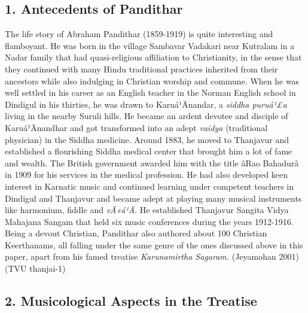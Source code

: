 \subsection*{1. Antecedents of Pandithar}

The life story of Abraham Pandithar (1859-1919) is quite interesting and flamboyant. He was born in the village Sambavar Vadakari near Kutralam in a Nadar family that had quasi-religious affiliation to Christianity, in the sense that they continued with many Hindu traditional practices inherited from their ancestors while also indulging in Christian worship and commune. When he was well settled in his career as an English teacher in the Norman English school in Dindigul in his thirties, he was drawn to Karuá¹Änandar, a \textit{siddha puruá¹£a} living in the nearby Suruli hills. He became an ardent devotee and disciple of Karuá¹Änandhar and got transformed into an adept \textit{vaidya} (traditional physician) in the Siddha medicine. Around 1883, he moved to Thanjavur and established a flourishing Siddha medical center that brought him a lot of fame and wealth. The British government awarded him with the title âRao Bahadurâ in 1909 for his services in the medical profession. He had also developed keen interest in Karnatic music and continued learning under competent teachers in Dindigul and Thanjavur and became adept at playing many musical instruments like harmonium, fiddle and \textit{vÄ«á¹Ä}. He established Thanjavur Sangita Vidya Mahajana Sangam that held six music conferences during the years 1912-1916. Being a devout Christian, Pandithar also authored about 100 Christian Keerthanams, all falling under the same genre of the ones discussed above in this paper, apart from his famed treatise \textit{Karunamirtha Sagaram.} (Jeyamohan 2001) (TVU thanjai-1)

\vspace{-.2cm}

\subsection*{2. Musicological Aspects in the Treatise}

\vspace{-.2cm}

